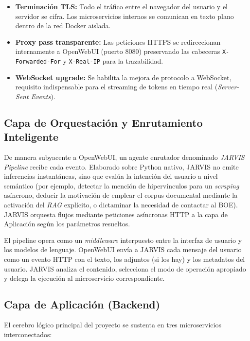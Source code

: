 \begin{itemize}
    \item \textbf{Terminación TLS:} Todo el tráfico entre el navegador del usuario y el servidor se cifra. Los microservicios internos se comunican en texto plano dentro de la red Docker aislada.
    \item \textbf{Proxy pass transparente:} Las peticiones HTTPS se redireccionan internamente a OpenWebUI (puerto 8080) preservando las cabeceras \texttt{X-Forwarded-For} y \texttt{X-Real-IP} para la trazabilidad.
    \item \textbf{WebSocket upgrade:} Se habilita la mejora de protocolo a WebSocket, requisito indispensable para el streaming de tokens en tiempo real (\textit{Server-Sent Events}).
\end{itemize}

\subsection{Capa de Orquestación y Enrutamiento Inteligente}
De manera subyacente a OpenWebUI, un agente enrutador denominado \textit{JARVIS Pipeline} recibe cada evento. Elaborado sobre Python nativo, JARVIS no emite inferencias instantáneas, sino que evalúa la intención del usuario a nivel semántico (por ejemplo, detectar la mención de hipervínculos para un \textit{scraping} asíncrono, deducir la motivación de emplear el corpus documental mediante la activación del \textit{RAG} explícito, o dictaminar la necesidad de contactar al BOE). JARVIS orquesta flujos mediante peticiones asíncronas HTTP a la capa de Aplicación según los parámetros resueltos.

El pipeline opera como un \textit{middleware} interpuesto entre la interfaz de usuario y los modelos de lenguaje. OpenWebUI envía a JARVIS cada mensaje del usuario como un evento HTTP con el texto, los adjuntos (si los hay) y los metadatos del usuario. JARVIS analiza el contenido, selecciona el modo de operación apropiado y delega la ejecución al microservicio correspondiente.

\subsection{Capa de Aplicación (Backend)}
El cerebro lógico principal del proyecto se sustenta en tres microservicios interconectados:


